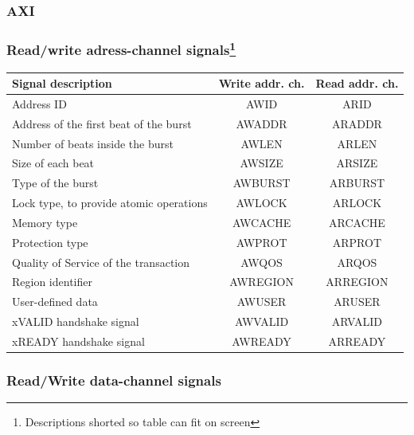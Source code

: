 \documentclass[a4paper]{scrartcl}
\begin{document}
        \subsubsection{AXI}
        \subsubsection*{Read/write adress-channel signals\footnote{Descriptions shorted so table can fit on screen}}
        \begin{longtable}[c]{| l | c | c |} 
            \hline
            Signal description & Write addr. ch. & Read addr. ch. \\ \hline \hline
            Address ID & AWID & ARID \\ \hline
            Address of the first beat of the burst & AWADDR & ARADDR \\ \hline
            Number of beats inside the burst & AWLEN & ARLEN \\\hline
            Size of each beat &   AWSIZE & ARSIZE \\ \hline
            Type of the burst &
            AWBURST &
            ARBURST \\ \hline
            Lock type, to provide atomic operations  &
            AWLOCK &
            ARLOCK \\ \hline
            Memory type&
            AWCACHE &
            ARCACHE \\ \hline
            Protection type &
            AWPROT &
            ARPROT \\ \hline
            Quality of Service of the transaction &
            AWQOS &
            ARQOS \\ \hline
            Region identifier &
            AWREGION &
            ARREGION \\ \hline
            User-defined data &
            AWUSER &
            ARUSER \\ \hline
            xVALID handshake signal &
            AWVALID &
            ARVALID \\ \hline
            xREADY handshake signal &
            AWREADY &
            ARREADY \\ \hline
        \end{longtable}\subsubsection*{Read/Write data-channel signals}
\end{document}
